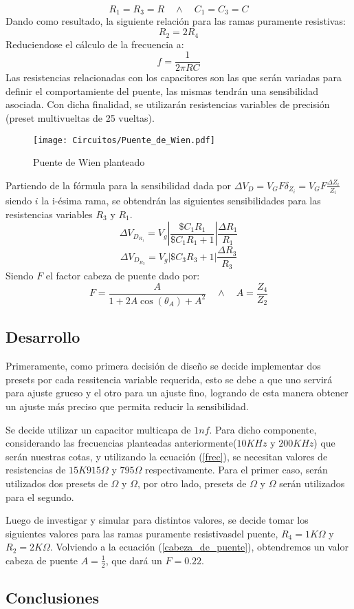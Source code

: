 \begin{equation}
R_1=R_3=R \quad	\wedge \quad C_1=C_3=C
\end{equation}
Dando como resultado, la siguiente relación para las ramas puramente resistivas:
\begin{equation}
R_2=2R_4
\end{equation}
Reduciendose el cálculo de la frecuencia a:
\begin{equation}
f=\frac{1}{2\pi RC}
\label{frec}
\end{equation}
Las resistencias relacionadas con los capacitores son las que serán variadas para definir el comportamiente del puente, las mismas tendrán una sensibilidad asociada. Con dicha finalidad, se utilizarán resistencias variables de precisión (preset multivueltas de 25 vueltas).

\begin{figure}[H]
\centering
\texttt{[image: Circuitos/Puente\_de\_Wien.pdf]}
\caption{Puente de Wien planteado}
\label{fig:Puente_de_wien}
\end{figure}
Partiendo de la fórmula para la sensibilidad dada por $\Delta V_D=V_GF\delta_{Z_i}=V_GF\frac{\Delta Z_i}{Z_i}$ siendo $i$ la i-ésima rama, se obtendrán las siguientes sensibilidades para las resistencias variables $R_3$ y $R_1$.
\begin{equation}
\Delta V_{D_{R_1}}=V_g\left|\frac{\$C_1R_1}{\$C_1R_1+1}\right|\frac{\Delta R_1}{R_1}
\end{equation}
\begin{equation}
\Delta V_{D_{R_3}}=V_g\left|\$C_3R_3+1\right|\frac{\Delta R_3}{R_3}
\end{equation}
Siendo $F$ el factor cabeza de puente dado por:
\begin{equation}
F=\frac{A}{1+2A\cos(\theta_A)+A^2} \quad \wedge \quad A=\frac{Z_4}{Z_2}
\label{cabeza_de_puente}
\end{equation} 
\subsection{Desarrollo}
Primeramente, como primera decisión de diseño se decide implementar dos presets por cada ressitencia variable requerida, esto se debe a que uno servirá para ajuste grueso y el otro para un ajuste fino, logrando de esta manera obtener un ajuste más preciso que permita reducir la sensibilidad. \par
Se decide utilizar un capacitor multicapa de $1nf$. Para dicho componente, considerando las frecuencias planteadas anteriormente($10KHz$ y $200KHz$) que serán nuestras cotas, y utilizando la ecuación (\ref{frec}), se necesitan valores de resistencias de $15K915 \Omega$ y $795 \Omega$ respectivamente. 
Para el primer caso, serán utilizados dos presets de $\Omega$ y $\Omega$, por otro lado, presets de $\Omega$ y $\Omega$ serán utilizados para el segundo. \par
Luego de investigar y simular para distintos valores, se decide tomar los siguientes valores para las ramas puramente resistivasdel puente, $R_4=1K\Omega$ y $R_2=2K\Omega$. Volviendo a la ecuación (\ref{cabeza_de_puente}), obtendremos un valor cabeza de puente $A=\frac{1}{2}$, que dará un $F=0.22$.


\subsection{Conclusiones}
